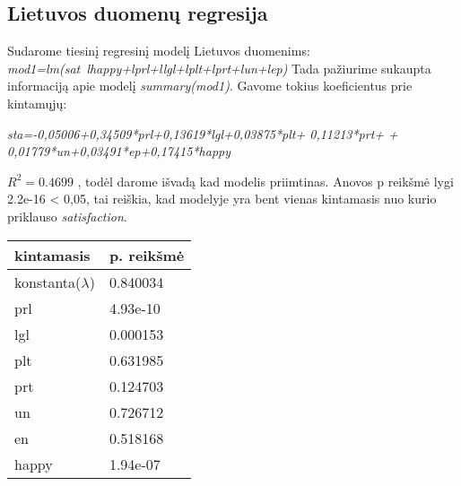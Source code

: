 \documentclass[12pt,a4paper]{article}
\theoremstyle{change}\newtheorem{salyga}{Uždavinys}
\begin{document}
\subsection{Lietuvos duomenų regresija}
Sudarome tiesinį regresinį modelį Lietuvos duomenims: \newline \textit{
mod1=lm(sat~lhappy+lprl+llgl+lplt+lprt+lun+lep) }
Tada pažiurime sukaupta informaciją apie modelį \textit{summary(mod1)}. Gavome tokius koeficientus prie kintamųjų:
\newline 
\begin{center} \textit{
        sta=-0,05006+0,34509*prl+0,13619*lgl+0,03875*plt+
0,11213*prt+ \newline + 0,01779*un+0,03491*ep+0,17415*happy 
} \end{center}
$R^2=0.4699$ , todėl darome išvadą kad modelis priimtinas. Anovos p reikšmė lygi 2.2e-16 < 0,05, tai reiškia, kad modelyje yra bent vienas kintamasis nuo kurio priklauso \textit{satisfaction}.
\begin{center}
\begin{tabular}{| l | l |}
\hline
kintamasis & p. reikšmė\\
\hline
 konstanta($\lambda$) & 0.840034 \\
\hline  prl & 4.93e-10 \\
\hline  lgl  & 0.000153 \\
\hline  plt & 0.631985\\ 
\hline prt  & 0.124703 \\ 
\hline un & 0.726712  \\
\hline en & 0.518168  \\
\hline happy& 1.94e-07 \\ \hline
\end{tabular}
\end{center}
\end{document}
